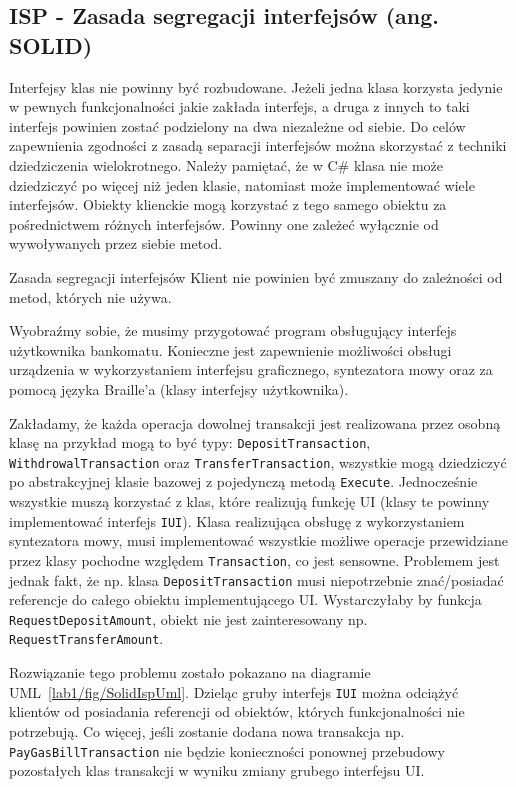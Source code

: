 \subsection{ISP - Zasada segregacji interfejsów (ang. SOL\textbf{I}D)}

Interfejsy klas nie powinny być rozbudowane. Jeżeli jedna klasa korzysta jedynie w pewnych funkcjonalności jakie zakłada interfejs, a druga z innych to taki interfejs powinien zostać podzielony na dwa niezależne od siebie. Do celów zapewnienia zgodności z zasadą separacji interfejsów można skorzystać z techniki dziedziczenia wielokrotnego. Należy pamiętać, że w C\# klasa nie może dziedziczyć po więcej niż jeden klasie, natomiast może implementować wiele interfejsów. Obiekty klienckie mogą korzystać z tego samego obiektu za pośrednictwem różnych interfejsów. Powinny one zależeć wyłącznie od wywoływanych przez siebie metod.  

\begin{myboxWithTitle}{Zasada segregacji interfejsów}
Klient nie powinien być zmuszany do zależności od metod, których nie używa.
\end{myboxWithTitle}


Wyobraźmy sobie, że musimy przygotować program obsługujący interfejs użytkownika bankomatu. Konieczne jest zapewnienie możliwości obsługi urządzenia w wykorzystaniem interfejsu graficznego, syntezatora mowy oraz za pomocą języka Braille'a (klasy interfejsy użytkownika). 

Zakładamy, że każda operacja dowolnej transakcji jest realizowana przez osobną klasę na przykład mogą to być typy: \texttt{DepositTransaction}, \texttt{WithdrowalTransaction} oraz \texttt{TransferTransaction}, wszystkie mogą dziedziczyć po abstrakcyjnej klasie bazowej z pojedynczą metodą \texttt{Execute}. Jednocześnie wszystkie muszą korzystać z klas, które realizują funkcję UI (klasy te powinny implementować interfejs \texttt{IUI}). Klasa realizująca obsługę z wykorzystaniem syntezatora mowy, musi implementować wszystkie możliwe operacje przewidziane przez klasy pochodne względem \texttt{Transaction}, co jest sensowne. Problemem jest jednak fakt, że np. klasa \texttt{DepositTransaction} musi niepotrzebnie znać/posiadać referencje do całego obiektu implementującego UI. Wystarczyłaby by funkcja \texttt{RequestDepositAmount}, obiekt nie jest zainteresowany np. \texttt{RequestTransferAmount}. 

Rozwiązanie tego problemu zostało pokazano na diagramie UML~\ref{lab1/fig/SolidIspUml}. Dzieląc gruby interfejs \texttt{IUI} można odciążyć klientów od posiadania referencji od obiektów, których funkcjonalności nie potrzebują. Co więcej, jeśli zostanie dodana nowa transakcja np. \texttt{PayGasBillTransaction} nie będzie konieczności ponownej przebudowy pozostałych klas transakcji w wyniku zmiany grubego interfejsu UI. 

